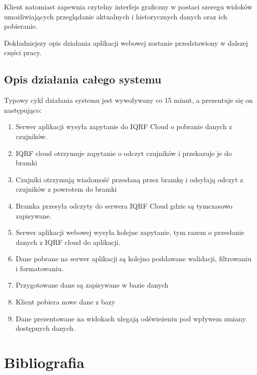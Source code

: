 \documentclass[a4paper, 12pt]{article}
\begin{document}
Klient natomiast zapewnia czytelny interfejs graficzny w postaci szeregu widoków umożliwiających przeglądanie aktualnych i 
historycznych danych oraz ich pobieranie.

Dokładniejszy opis działania aplikacji webowej zostanie przedstawiony w dalszej części pracy.

\subsection{Opis działania całego systemu}

Typowy cykl działania systemu jest wywoływany co 15 minut, a prezentuje się on następująco:

\begin{enumerate}
    \item Serwer aplikacji wysyła zapytanie do IQRF Cloud o pobranie danych z czujników.
    \item IQRF cloud otrzymuje zapytanie o odczyt czujników i przekazuje je do bramki
    \item Czujniki otrzymują wiadomość przesłaną przez bramkę i odsyłają odczyt z czujników z powrotem do bramki
    \item Bramka przesyła odczyty do serwera IQRF Cloud gdzie są tymczasowo zapisywane.
    \item Serwer aplikacji webowej wysyła kolejne zapytanie, tym razem o przesłanie danych z IQRF cloud
do aplikacji.
    \item Dane pobrane na serwer aplikacji są kolejno poddawane walidacji, filtrowaniu i formatowaniu.
    \item Przygotowane dane są zapisywane w bazie danych 
    \item Klient pobiera nowe dane z bazy
    \item Dane prezentowane na widokach ulegają odświeżeniu pod wpływem zmiany dostępnych danych.
\end{enumerate}

\section{Bibliografia}

\printbibliography
\end{document}
